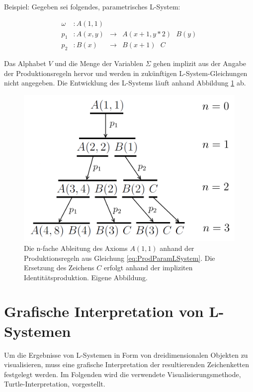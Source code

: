 Beispiel: Gegeben sei folgendes, parametrisches L-System:

\begin{equation}
\begin{array}{llll}
\omega & : A(1,1) \\
p_1 & : A(x,y) &\rightarrow& A(x+1, y*2)\text{ }B(y) \\
p_2 &  : B(x) &\rightarrow& B(x+1)\text{ }C 
\end{array}
\label{eq:ProdParamLSystem}
\end{equation} 

Das Alphabet $V$ und die Menge der Variablen $\Sigma$ gehen implizit aus der Angabe der Produktionsregeln hervor und werden in zukünftigen L-System-Gleichungen nicht angegeben. Die Entwicklung des L-Systems läuft anhand Abbildung \ref{fig:ParamLSystemBeispiel} ab. 

\begin{figure} [hbtp]
	\centering
	\includegraphics[height=0.3\textheight]{images/ParamLSystemBeispiel.png}
	\caption{Die n-fache Ableitung des Axioms $A(1,1)$ anhand der Produktionsregeln aus Gleichung \ref{eq:ProdParamLSystem}. Die Ersetzung des Zeichens $C$ erfolgt anhand der impliziten Identitätsproduktion. Eigene Abbildung.}
	\label{fig:ParamLSystemBeispiel}
\end{figure}

\section{Grafische Interpretation von L-Systemen}

Um die Ergebnisse von L-Systemen in Form von dreidimensionalen Objekten zu visualisieren, muss eine grafische Interpretation der resultierenden Zeichenketten festgelegt werden. Im Folgenden wird die verwendete Visualisierungsmethode, Turtle-Interpretation, vorgestellt.

